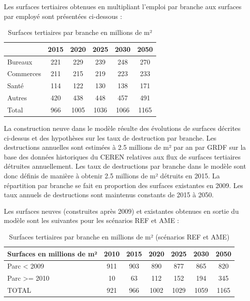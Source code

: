 \documentclass[10.5pt,a4paper]{article}
\begin{document}
{Les surfaces tertiaires obtenues en multipliant l’emploi par branche aux surfaces par employé sont présentées ci-dessous : 
\begin{table}[h!]
\caption{Surfaces tertiaires par branche en millions de m²}
\begin{center}
\begin{tabular}{|l|c|c|c|c|c|}
\hline
			& 2015	& 	2020	& 	2025	 &	2030		& 2050 \\
\hline
Bureaux		& 221			& 229	& 239 & 	248 & 	270 \\
Commerces	& 211 & 215 & 219 &	223	& 233 \\
Santé	& 114	& 122 & 130 &	138 &	171 \\
Autres	&	420		& 438		& 448		& 457		& 491 \\
\hline
Total	& 966	&	1005 & 1036		& 1066		& 1165 \\
\hline
\end{tabular}
\end{center}
\end{table}

La construction neuve dans le modèle résulte des évolutions de surfaces décrites ci-dessus et des hypothèses sur les taux de destruction par branche.
Les destructions annuelles sont estimées à 2.5 millions de m² par an par GRDF sur la base des données historiques du CEREN relatives aux flux de surfaces tertiaires détruites annuellement. Les taux de destructions par branche dans le modèle sont donc définis de manière à obtenir 2.5 millions de m² détruits en 2015. La répartition par branche se fait en proportion des surfaces existantes en 2009. Les taux annuels de destructions sont maintenus constants de 2015 à 2050. 

Les surfaces neuves (construites après 2009) et existantes obtenues en sortie du modèle sont les suivantes pour les scénarios REF et AME :

\begin{table}[h!]
\caption{Surfaces tertiaires par branche en millions de m² (scénarios REF et AME)}
\begin{center}
\begin{tabular}{|l|c|c|c|c|c|c|}
\hline
Surfaces en millions de m²	& 2010	& 2015	& 2020 & 	2025 & 	2030	& 2050 \\
\hline
Parc < 2009		& 911	& 903	& 890 	& 877		& 865			& 820 \\
Parc >= 2010	& 10	& 63	& 112		& 152		& 194			& 345 \\
TOTAL					& 921	& 966	& 1002	& 1029 	& 1059	 	& 1165 \\
\hline
\end{tabular}
\end{center}
\end{table}

}
\end{document}
